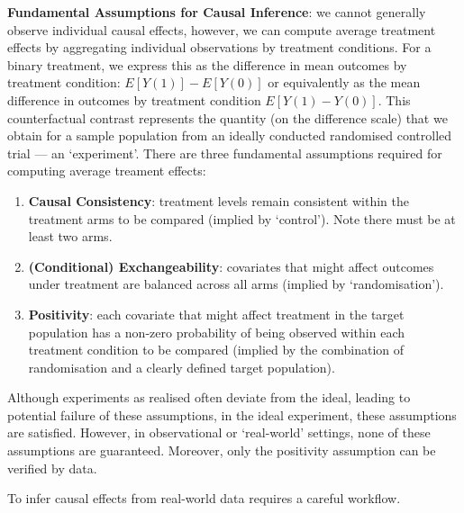 \documentclass[
  single column]{article}
\providecommand{\tightlist}{%
  \setlength{\itemsep}{0pt}\setlength{\parskip}{0pt}}\usepackage{longtable,booktabs,array}
\begin{document}
\textbf{Fundamental Assumptions for Causal Inference}: we cannot
generally observe individual causal effects, however, we can compute
average treatment effects by aggregating individual observations by
treatment conditions. For a binary treatment, we express this as the
difference in mean outcomes by treatment condition:
\(E[Y(1)] - E[Y(0)]\) or equivalently as the mean difference in outcomes
by treatment condition \(E[Y(1) - Y(0)]\). This counterfactual contrast
represents the quantity (on the difference scale) that we obtain for a
sample population from an ideally conducted randomised controlled trial
--- an `experiment'. There are three fundamental assumptions required
for computing average treament effects:

\begin{enumerate}
\def\labelenumi{\arabic{enumi}.}
\tightlist
\item
  \textbf{Causal Consistency}: treatment levels remain consistent within
  the treatment arms to be compared (implied by `control'). Note there
  must be at least two arms.
\item
  \textbf{(Conditional) Exchangeability}: covariates that might affect
  outcomes under treatment are balanced across all arms (implied by
  `randomisation').
\item
  \textbf{Positivity}: each covariate that might affect treatment in the
  target population has a non-zero probability of being observed within
  each treatment condition to be compared (implied by the combination of
  randomisation and a clearly defined target population).
\end{enumerate}

Although experiments as realised often deviate from the ideal, leading
to potential failure of these assumptions, in the ideal experiment,
these assumptions are satisfied. However, in observational or
`real-world' settings, none of these assumptions are guaranteed.
Moreover, only the positivity assumption can be verified by data.

To infer causal effects from real-world data requires a careful
workflow.
\end{document}
